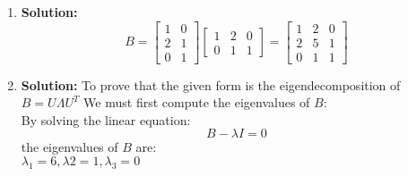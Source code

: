 \begin{enumerate}
    \item \textbf{Solution:}
        \[
            B = \begin{bmatrix}
                    1 & 0\\
                    2 & 1\\
                    0 & 1
              \end{bmatrix} 
              \begin{bmatrix}
                    1 & 2 & 0\\ 
                    0 & 1 & 1
              \end{bmatrix} = 
              \begin{bmatrix}
                  1 & 2 & 0\\      
                  2 & 5 & 1\\
                  0 & 1 & 1
              \end{bmatrix}
        \]
    \item \textbf{Solution:}
        To prove that the given form is the eigendecomposition of \(B = U \Lambda U^T\)
        We must first compute the eigenvalues of \(B\):\\
        By solving the linear equation:
        \[
            B - \lambda I = 0
        \]
        the eigenvalues of \(B\) are:\\
        \(\lambda_{1} = 6, \lambda{2} = 1, \lambda_{3} = 0 \) \\
        

\end{enumerate}
